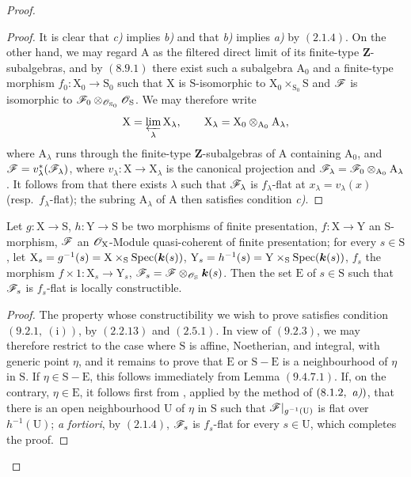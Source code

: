 \begin{proof}
\begin{proof}
It is clear that \emph{c)} implies \emph{b)} and that \emph{b)} implies \emph{a)} by
$(2.1.4)$. On the other hand, we may regard $\mathrm{A}$ as the filtered
direct limit of its finite-type $\mathbf{Z}$-subalgebras, and by $(8.9.1)$
there exist such a subalgebra $\mathrm{A}_0$ and a finite-type morphism
$f_0:\mathrm{X}_0\to\mathrm{S}_0$ such that $\mathrm{X}$ is
$\mathrm{S}$-isomorphic to
$\mathrm{X}_0\times_{\mathrm{S}_0}\mathrm{S}$ and $\mathscr{F}$ is isomorphic
to $\mathscr{F}_0\otimes_{\mathscr{O}_{\mathrm{S}_0}}\mathscr{O}_{\mathrm{S}}$. We may
therefore write
\[
  \mathrm{X}=\varprojlim_\lambda \mathrm{X}_\lambda,\qquad
  \mathrm{X}_\lambda=\mathrm{X}_0\otimes_{\mathrm{A}_0}\mathrm{A}_\lambda,
\]
where $\mathrm{A}_\lambda$ runs through the finite-type
$\mathbf{Z}$-subalgebras of $\mathrm{A}$ containing $\mathrm{A}_0$, and
$\mathscr{F}=v_\lambda^*(\mathscr{F}_\lambda)$, where
$v_\lambda:\mathrm{X}\to\mathrm{X}_\lambda$ is the canonical projection
and
$\mathscr{F}_\lambda=\mathscr{F}_0\otimes_{\mathrm{A}_0}\mathrm{A}_\lambda$. It
follows from  that there exists $\lambda$ such that
$\mathscr{F}_\lambda$ is $f_\lambda$-flat at
$x_\lambda=v_\lambda(x)$ (resp.\ $f_\lambda$-flat); the subring
$\mathrm{A}_\lambda$ of $\mathrm{A}$ then satisfies condition \emph{c)}.
\end{proof}

\begin{proposition}[11.2.8]
\label{IV.11.2.8}
Let $g:\mathrm{X}\to\mathrm{S}$, $h:\mathrm{Y}\to\mathrm{S}$ be two morphisms of finite presentation, $f:\mathrm{X}\to\mathrm{Y}$ an S-morphism, $\mathscr{F}$ an $\mathscr{O}_\mathrm{X}$-Module quasi-coherent of finite presentation; for every $s\in\mathrm{S}$, let $\mathrm{X}_s=g^{-1}(s)=\mathrm{X}\times_\mathrm{S}\operatorname{Spec}(\boldsymbol{k}(s))$, $\mathrm{Y}_s=h^{-1}(s)=\mathrm{Y}\times_\mathrm{S}\operatorname{Spec}(\boldsymbol{k}(s))$, $f_s$ the morphism $f\times 1:\mathrm{X}_s\to\mathrm{Y}_s$, $\mathscr{F}_s=\mathscr{F}\otimes_{\mathscr{O}_\mathrm{S}}\boldsymbol{k}(s)$. Then the set $\mathrm{E}$ of $s\in\mathrm{S}$ such that $\mathscr{F}_s$ is $f_s$-flat is locally constructible.
\end{proposition}

\begin{proof}
The property whose constructibility we wish to prove satisfies condition
$(9.2.1,~(\mathrm{i}))$, by $(2.2.13)$ and $(2.5.1)$. In view of
$(9.2.3)$, we may therefore restrict to the case where $\mathrm{S}$ is
affine, Noetherian, and integral, with generic point $\eta$, and it remains
to prove that $\mathrm{E}$ or $\mathrm{S}-\mathrm{E}$ is a neighbourhood
of $\eta$ in $\mathrm{S}$. If
$\eta\in\mathrm{S}-\mathrm{E}$, this follows immediately from Lemma
$(9.4.7.1)$. If, on the contrary, $\eta\in\mathrm{E}$, it follows first
from , applied by the method of $(8.1.2,~\emph{a)})$, that there
is an open neighbourhood $\mathrm{U}$ of $\eta$ in $\mathrm{S}$ such that
$\mathscr{F}|_{g^{-1}(\mathrm{U})}$ is flat over $h^{-1}(\mathrm{U})$; \emph{a
fortiori}, by $(2.1.4)$, $\mathscr{F}_s$ is $f_s$-flat for every
$s\in\mathrm{U}$, which completes the proof.
\end{proof}


\end{proof}
